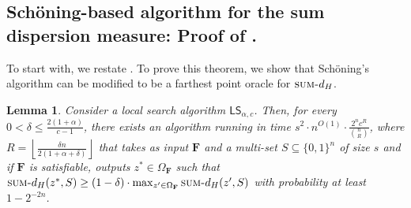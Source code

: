 \documentclass[11pt, letterpaper]{article}
\newtheorem{lemma}[theorem]{Lemma}
\theoremstyle{definition}
\newcommand{\f}{\mathbf{F}}
\newcommand{\Om}{\Omega_{\f}}
\newcommand{\LS}{\textsf{LS}}
\newcommand{\sumd}{\textsc{sum-}d_H}
\newcommand{\sch}{Sch\"{o}ning\xspace}
\newcommand{\floor}[1]{{\left\lfloor{#1}\right\rfloor}}
\begin{document}
\subsection{\sch-based algorithm for the sum dispersion measure: Proof of .}
\label{app:schsum}
To start with, we restate . 
\schopts*
To prove this theorem, we show that \sch's algorithm can be modified to be a farthest point oracle for $\sumd$. 
\begin{lemma} \label{lem:schFarthestSum}
    Consider a local search algorithm $\LS_{\alpha, c}$. Then, for every $0 < \delta \leq \frac{2(1+\alpha)}{c-1}$, there exists an algorithm  running in time $s^2 \cdot n^{O(1)} \cdot \frac{2^n c^{R}}{\binom{n}{R} }$, where $R=\floor{\frac{\delta n}{2(1+\alpha+\delta)}}$ that takes as input $\f$ and a multi-set $S \subseteq \{0,1\}^n$ of size $s$ and if $\f$ is satisfiable, outputs $z^* \in \Om$ such that $\sumd(z^*, S) \geq \left(1-\delta\right) \cdot \max_{z' \in \Om} \sumd(z', S)$ with probability at least $1-2^{-2n}$. 
 \end{lemma}
 
\end{document}
